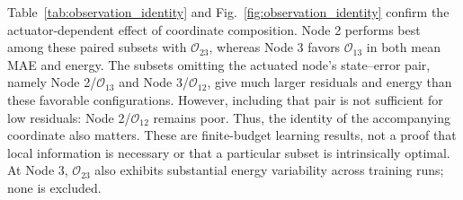 Table~\ref{tab:observation_identity} and Fig.~\ref{fig:observation_identity} confirm the actuator-dependent effect of coordinate composition. Node 2 performs best among these paired subsets with $\mathcal O_{23}$, whereas Node 3 favors $\mathcal O_{13}$ in both mean MAE and energy. The subsets omitting the actuated node's state--error pair, namely Node 2/$\mathcal O_{13}$ and Node 3/$\mathcal O_{12}$, give much larger residuals and energy than these favorable configurations. However, including that pair is not sufficient for low residuals: Node 2/$\mathcal O_{12}$ remains poor. Thus, the identity of the accompanying coordinate also matters. These are finite-budget learning results, not a proof that local information is necessary or that a particular subset is intrinsically optimal. At Node 3, $\mathcal O_{23}$ also exhibits substantial energy variability across training runs; none is excluded.
